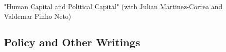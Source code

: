 \documentclass[11pt,letterpaper]{report}
\begin{document}
      \begin{tablist}

            \item[2026] \tab{}"Human Capital and Political Capital" (with Julian Martinez-Correa and Valdemar Pinho Neto)

       \end{tablist}

    \subsection*{Policy and Other Writings}
\end{document}
